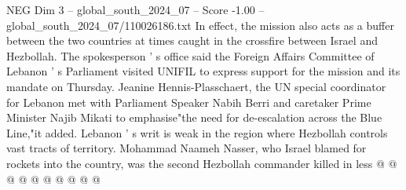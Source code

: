\begin{textsample}{NEG Dim 3 – global\_south\_2024\_07 – Score -1.00 – global\_south\_2024\_07/110026186.txt}
In effect, the mission also acts as a buffer between the two countries at times caught in the crossfire between Israel and Hezbollah.
The spokesperson ' s office said the Foreign Affairs Committee of Lebanon ' s Parliament visited UNIFIL to express support for the mission and its mandate on Thursday.
Jeanine Hennis-Plasschaert, the UN special coordinator for Lebanon met with Parliament Speaker Nabih Berri and caretaker Prime Minister Najib Mikati to emphasise"the need for de-escalation across the Blue Line,"it added.
Lebanon ' s writ is weak in the region where Hezbollah controls vast tracts of territory.
Mohammad Naameh Nasser, who Israel blamed for rockets into the country, was the second Hezbollah commander killed in less @ @ @ @ @ @ @ @ @ @

\end{textsample}
